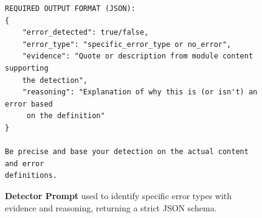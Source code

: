 \begin{figure}[htbp]
\begin{tcolorbox}[
    title=\textbf{Detector Prompt},
    colback=green!1!white,
    colframe=green!50!black,
    fonttitle=\bfseries
]
\begin{verbatim}
REQUIRED OUTPUT FORMAT (JSON):
{
    "error_detected": true/false,
    "error_type": "specific_error_type or no_error",
    "evidence": "Quote or description from module content supporting 
    the detection",
    "reasoning": "Explanation of why this is (or isn't) an error based 
     on the definition"
}

Be precise and base your detection on the actual content and error
definitions.
\end{verbatim}
\end{tcolorbox}
\vspace{-1em}
\caption{\textbf{Detector Prompt} used to identify specific error types with evidence and reasoning, returning a strict JSON schema.}
\label{fig:detector_prompt}
\end{figure}











